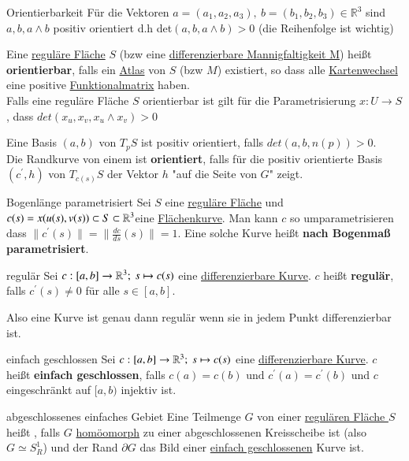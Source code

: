 \begin{titleDef}{Orientierbarkeit}
\label{orientierbar}
Für die Vektoren $a=(a_1,a_2,a_3),\ b=(b_1,b_2,b_3)\in\mathbb{R}^3$ sind $a,b,a\wedge b$  positiv orientiert d.h det$(a,b,a\wedge b)>0$ (die Reihenfolge ist wichtig)\par
Eine \hyperref[regFlaeche]{reguläre Fläche} $S$ (bzw eine \hyperref[diffMannigfaltigkeit]{differenzierbare Mannigfaltigkeit M}) heißt \textbf{orientierbar},  falls ein \hyperref[Atlas]{Atlas} von $S$ (bzw $M$) existiert, so dass alle \hyperref[Kartenwechsel]{Kartenwechsel} eine positive \hyperref[funktmatrix]{Funktionalmatrix} haben.\\
Falls eine reguläre Fläche $S$ orientierbar ist gilt für die Parametrisierung $x:U\to S$, dass $det(x_u,x_v,x_u\wedge x_v)>0$\par
Eine Basis $(a,b)$ von $T_pS$ ist positiv orientiert, falls $det(a,b,n(p))>0$.\\
Die Randkurve von einem \aeGebiet ist \textbf{orientiert}, falls für die positiv orientierte Basis $(c^\prime,h)$ von $T_{c(s)}S$ der Vektor $h$ "auf die Seite von $G$" zeigt.
\end{titleDef}

\begin{titleDef}{Bogenlänge parametrisiert}
\label{bogenlaenge}
Sei $S$ eine \hyperref[regFlaeche]{reguläre Fläche} und $c(s)=x(u(s),v(s))\subset S\subset\mathbb{R}^3 $eine \hyperref[diffFlaechenkurve]{Flächenkurve}. Man kann $c$ so umparametrisieren dass $\lVert c^\prime(s)\rVert=\lVert \frac{dc}{ds}(s)\rVert=1$. Eine solche Kurve heißt \textbf{nach Bogenmaß parametrisiert}.
\end{titleDef}

\begin{titleDef}{regulär}
\label{regulaer}
Sei $c:[a,b]\to \mathbb{R}^3;\ s\mapsto c(s)$ eine \hyperref[kurve]{differenzierbare Kurve}. $c$ heißt \textbf{regulär}, falls $c^\prime(s)\neq0$ für alle $s\in[a,b]$.\par
Also eine Kurve ist genau dann regulär wenn sie in jedem Punkt differenzierbar ist.
\end{titleDef}

\begin{titleDef}{einfach geschlossen}
\label{einfachgeschlossen}
Sei $c:[a,b]\to \mathbb{R}^3;\ s\mapsto c(s)$ eine \hyperref[kurve]{differenzierbare Kurve}. $c$ heißt \textbf{einfach geschlossen}, falls $c(a)=c(b)\text{ und }c^\prime(a)=c^\prime(b)$ und $c$ eingeschränkt auf $[a,b)$ injektiv ist.
\end{titleDef}

\begin{titleDef}{abgeschlossenes einfaches Gebiet}
\label{abgeinfachGebiet}
Eine Teilmenge $G$ von einer \hyperref[regFlaeche]{regulären Fläche }$S$ heißt \textbf{\aeGebiet}, falls $G$ \hyperref[homoemorph]{homöomorph} zu einer abgeschlossenen Kreisscheibe ist (also $G\simeq S_R^1$) und der Rand $\partial G$ das Bild einer \hyperref[einfachgeschlossen]{einfach geschlossenen} Kurve ist.
\end{titleDef}